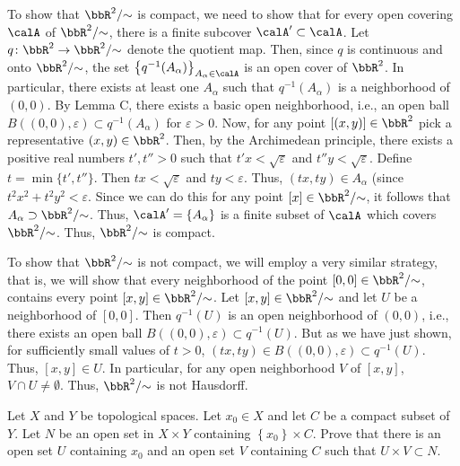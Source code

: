 \begin{solution}
  To show that \(\bbR^2/{\sim}\) is compact, we need to show that for every
  open covering \(\calA\) of \(\bbR^2/{\sim}\), there is a finite subcover
  \(\calA'\subset\calA\). Let \(q\colon\bbR^2\to\bbR^2/{\sim}\) denote
  the quotient map. Then, since \(q\) is continuous and onto
  \(\bbR^2/{\sim}\), the set
  \(\left\{q^{-1}(A_\alpha)\right\}_{A_\alpha\in\calA}\) is an open cover
  of \(\bbR^2\). In particular, there exists at least one \(A_\alpha\) such
  that \(q^{-1}(A_\alpha)\) is a neighborhood of \((0,0)\). By Lemma C,
  there exists a basic open neighborhood, i.e., an open ball
  \(B((0,0),\varepsilon)\subset q^{-1}(A_\alpha)\) for
  \(\varepsilon>0\). Now, for any point \([(x,y)]\in\bbR^2\) pick a
  representative \((x,y)\in\bbR^2\). Then, by the Archimedean principle,
  there exists a positive real numbers \(t',t''>0\) such that
  \(t'x<\sqrt{\varepsilon}\) and \(t''y<\sqrt{\varepsilon}\). Define
  \(t=\min\{t',t''\}\). Then \(tx<\sqrt{\varepsilon}\) and
  \(ty<\varepsilon\). Thus, \((tx,ty)\in A_\alpha\) (since
  \(t^2x^2+t^2y^2<\varepsilon\). Since we can do this for any point
  \([x]\in\bbR^2/{\sim}\), it follows that
  \(A_\alpha\supset\bbR^2/{\sim}\). Thus,
  \(\calA'=\left\{A_\alpha\right\}\) is a finite subset of \(\calA\) which
  covers \(\bbR^2/{\sim}\). Thus, \(\bbR^2/{\sim}\) is compact.

  To show that \(\bbR^2/{\sim}\) is not compact, we will employ a very
  similar strategy, that is, we will show that every neighborhood of the
  point \([0,0]\in\bbR^2/{\sim}\), contains every point
  \([x,y]\in\bbR^2/{\sim}\). Let \([x,y]\in\bbR^2/{\sim}\) and let \(U\) be
  a neighborhood of \([0,0]\). Then \(q^{-1}(U)\) is an open neighborhood
  of \((0,0)\), i.e., there exists an open ball
  \(B((0,0),\varepsilon)\subset q^{-1}(U)\). But as we have just shown,
  for sufficiently small values of \(t>0\),
  \((tx,ty)\in B((0,0),\varepsilon)\subset q^{-1}(U)\). Thus,
  \([x,y]\in U\). In particular, for any open neighborhood \(V\) of
  \([x,y]\), \(V\cap U\neq\emptyset\). Thus, \(\bbR^2/{\sim}\) is not
  Hausdorff.
\end{solution}
\begin{problem}
  Let \(X\) and \(Y\) be topological spaces. Let \(x_0\in X\) and let \(C\)
  be a compact subset of \(Y\). Let \(N\) be an open set in \(X\times Y\)
  containing \(\left\{x_0\right\}\times C\). Prove that there is an open
  set \(U\) containing \(x_0\) and an open set \(V\) containing \(C\) such
  that \(U\times V\subset N\).
\end{problem}
